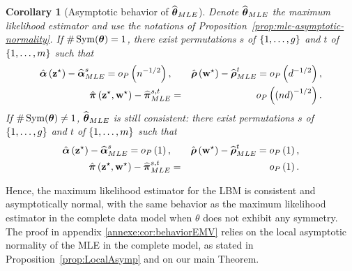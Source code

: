 \documentclass[bj]{imsart}
\numberwithin{equation}{section}
\theoremstyle{plain}
\newtheorem{corollaire}[thm]{Corollary}
\theoremstyle{remark}
\newcommand{\CK}[1]{\textcolor{red}{ #1}}
\begin{document}
\begin{corollaire}[Asymptotic behavior of $\widehat{\boldsymbol{\theta}}_{MLE}$]\label{cor:behaviorEMV} Denote $\widehat{\boldsymbol{\theta}}_{MLE}$ the maximum likelihood estimator and use the notations of Proposition~\ref{prop:mle-asymptotic-normality}. If $\# \operatorname{Sym}(\boldsymbol{\theta})=1$, there exist permutations $s$ of $\{1, \dots, g\}$ and $t$ of $\{1, \dots, m\}$ such that
\begin{eqnarray*}
\hat{\bpi}\left(\bzs\right)-\bpiEMV^{s}=o_{P}\left(\n^{-1/2}\right),&&\hat{\brho}\left(\bws\right)-\brhoEMV^{t}=o_{P}\left(\dd^{-1/2}\right),\\
\hat{\bal}\left(\bzs,\bws\right)-\balEMV^{s,t}&=&o_{P}\left(\left(\n\dd\right)^{-1/2}\right).\\
\end{eqnarray*}
If $\# \operatorname{Sym}(\boldsymbol{\theta})\neq1$,  $\widehat{\boldsymbol{\theta}}_{MLE}$ is still consistent:  there exist permutations $s$ of $\{1, \dots, g\}$ and $t$ of $\{1, \dots, m\}$ such that
\begin{eqnarray*}
\hat{\bpi}\left(\bzs\right)-\bpiEMV^{s}=o_{P}\left(1\right),&&\hat{\brho}\left(\bws\right)-\brhoEMV^{t}=o_{P}\left(1\right),\\
\hat{\bal}\left(\bzs,\bws\right)-\balEMV^{s,t}&=&o_{P}\left(1\right). \\
\end{eqnarray*}
\end{corollaire}
Hence, the maximum likelihood estimator for the LBM is consistent and asymptotically normal, with the same behavior as the maximum likelihood estimator in the complete data model when $\theta$ does not exhibit any symmetry.
The proof in appendix \ref{annexe:cor:behaviorEMV} relies on the local asymptotic normality of the MLE in the complete model, as stated in Proposition~\ref{prop:LocalAsymp} and on our main Theorem.
\end{document}

